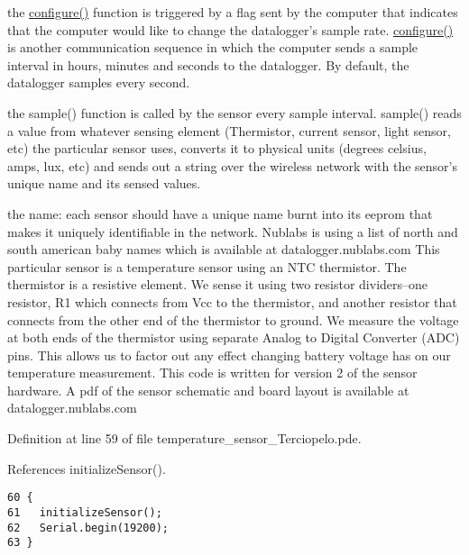 the \hyperlink{nublogger_8h_e369b3765489ee8bd0ea791c1843630f}{configure()} function is triggered by a flag sent by the computer that indicates that the computer would like to change the datalogger's sample rate. \hyperlink{nublogger_8h_e369b3765489ee8bd0ea791c1843630f}{configure()} is another communication sequence in which the computer sends a sample interval in hours, minutes and seconds to the datalogger. By default, the datalogger samples every second.

the sample() function is called by the sensor every sample interval. sample() reads a value from whatever sensing element (Thermistor, current sensor, light sensor, etc) the particular sensor uses, converts it to physical units (degrees celsius, amps, lux, etc) and sends out a string over the wireless network with the sensor's unique name and its sensed values.

the name: each sensor should have a unique name burnt into its eeprom that makes it uniquely identifiable in the network. Nublabs is using a list of north and south american baby names which is available at datalogger.nublabs.com This particular sensor is a temperature sensor using an NTC thermistor. The thermistor is a resistive element. We sense it using two resistor dividers--one resistor, R1 which connects from Vcc to the thermistor, and another resistor that connects from the other end of the thermistor to ground. We measure the voltage at both ends of the thermistor using separate Analog to Digital Converter (ADC) pins. This allows us to factor out any effect changing battery voltage has on our temperature measurement. This code is written for version 2 of the sensor hardware. A pdf of the sensor schematic and board layout is available at datalogger.nublabs.com 

Definition at line 59 of file temperature\_\-sensor\_\-Terciopelo.pde.

References initializeSensor().

\begin{Code}\begin{verbatim}60 {
61   initializeSensor();
62   Serial.begin(19200);
63 }
\end{verbatim}
\end{Code}


